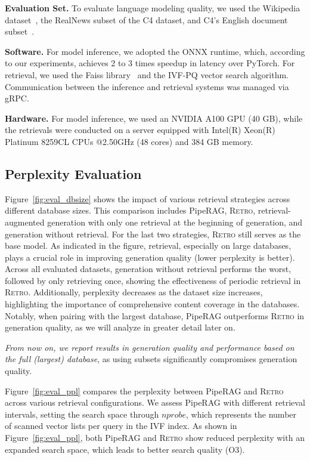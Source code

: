  
\textbf{Evaluation Set.}
To evaluate language modeling quality, we used the Wikipedia dataset~\cite{wikipedia}, the RealNews subset of the C4 dataset, and C4's English document subset~\cite{dodge2021documenting, raffel2020exploring}.

\textbf{Software.}
For model inference, we adopted the ONNX runtime, which, according to our experiments, achieves 2 to 3 times speedup in latency over PyTorch. For retrieval, we used the Faiss library~\cite{johnson2019billion} and the IVF-PQ vector search algorithm. Communication between the inference and retrieval systems was managed via gRPC.

\textbf{Hardware.}
For model inference, we used an NVIDIA A100 GPU (40 GB), while the retrievals were conducted on a server equipped with Intel(R) Xeon(R) Platinum 8259CL CPUs @2.50GHz (48 cores) and 384 GB memory. 

\subsection{Perplexity Evaluation}

Figure~\ref{fig:eval_dbsize} shows the impact of various retrieval strategies across different database sizes. This comparison includes PipeRAG, \textsc{Retro}, retrieval-augmented generation with only one retrieval at the beginning of generation, and generation without retrieval. For the last two strategies, \textsc{Retro} still serves as the base model. 
As indicated in the figure, retrieval, especially on large databases, plays a crucial role in improving generation quality (lower perplexity is better). Across all evaluated datasets, generation without retrieval performs the worst, followed by only retrieving once, showing the effectiveness of periodic retrieval in \textsc{Retro}. Additionally, perplexity decreases as the dataset size increases, highlighting the importance of comprehensive content coverage in the databases. Notably, when pairing with the largest database, PipeRAG outperforms \textsc{Retro} in generation quality, as we will analyze in greater detail later on. 

\textit{From now on, we report results in generation quality and performance based on the full (largest) database}, as using subsets significantly compromises generation quality.

Figure~\ref{fig:eval_ppl} compares the perplexity between PipeRAG and \textsc{Retro} across various retrieval configurations. We assess PipeRAG with different retrieval intervals, setting the search space through \( nprobe \), which represents the number of scanned vector lists per query in the IVF index. As shown in Figure~\ref{fig:eval_ppl}, both PipeRAG and \textsc{Retro} show reduced perplexity with an expanded search space, which leads to better search quality (O3).

